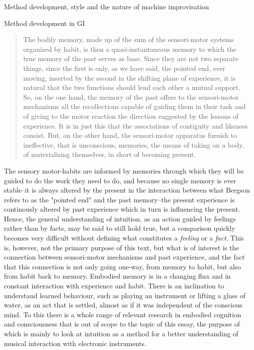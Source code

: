 \documentclass[presentation]{beamer}
\begin{document}
\begin{frame}[label={sec:org08c5441}]{Method development, style and the nature of machine improvisation}
\begin{block}{Method development in GI}
\begin{quote}
The bodily memory, made up of the sum of the sensori-motor systems organized by habit, is then a quasi-instantaneous memory to which the true memory of the past serves as base. Since they are not two separate things, since the first is only, as we have said, the pointed end, ever moving, inserted by the second in the shifting plane of experience, it is natural that the two functions should lend each other a mutual support.  So, on the one hand, the memory of the past offers to the sensori-motor mechanisms all the recollections capable of guiding them in their task and of giving to the motor reaction the direction suggested by the lessons of experience. It is in just this that the associations of contiguity and likeness consist. But, on the other hand, the sensori-motor apparatus furnish to ineffective, that is unconscious, memories, the means of taking on a body, of materializing themselves, in short of becoming present. \citep[p. 152-3]{bergson91}
\end{quote}

The sensory motor-habits are informed by memories through which they will be guided to do the work they need to do, and because no single memory is ever stable--it is always altered by the present in the interaction between what Bergson refers to as the "pointed end" and the past memory--the present experience is continously altered by past experience which in turn is influencing the present. Hence, the general understanding of intuition, as an action guided by feelings rather than by facts, may be said to still hold true, but a comparison quickly becomes very difficult without defining what constitutes a \emph{feeling} or a \emph{fact}. This is, however, not the primary purpose of this text, but what is of interest is the connection between sensori-motor mechanisms and past experience, and the fact that this connection is not only going one-way, from memory to habit, but also from habit back to memory. Embodied memory is in a changing flux and in constant interaction with experience and habit. There is an inclination to understand learned behaviour, such as playing an instrument or lifting a glass of water, as an act that is settled, almost as if it was independent of the conscious mind. To this there is a whole range of relevant research in  embodied cognition and consciousness that is out of scope to the topic of this essay, the purpose of which is mainly to look at intuition as a method for a better understanding of musical interaction with electronic instruments.


\end{block}
\end{frame}
\end{document}
